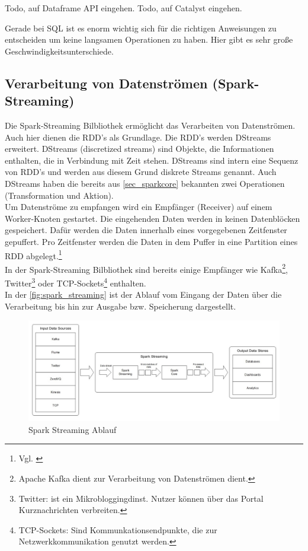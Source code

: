 Todo, auf Dataframe API eingehen.
Todo, auf Catalyst eingehen.


Gerade bei SQL ist es enorm wichtig sich für die richtigen Anweisungen zu entscheiden um keine langsamen Operationen zu haben. 
Hier gibt es sehr große Geschwindigkeitsunterschiede.

\newpage
\subsection{Verarbeitung von Datenströmen (Spark-Streaming)}


Die Spark-Streaming Bilbliothek ermöglicht das Verarbeiten von Datenströmen. Auch hier dienen die RDD's als Grundlage. Die RDD's werden DStreams erweitert. DStreams (discretized streams) sind Objekte, die Informationen enthalten, die in Verbindung mit Zeit stehen. DStreams sind intern eine Sequenz von RDD's und werden aus diesem Grund diskrete Streams genannt.
Auch DStreams haben die bereits aus \ref{sec_sparkcore} bekannten zwei Operationen (Transformation und Aktion). \\

\noindent
Um Datenströme zu empfangen wird ein Empfänger (Receiver) auf einem Worker-Knoten gestartet. Die eingehenden Daten werden in keinen Datenblöcken gespeichert. Dafür werden die Daten innerhalb eines vorgegebenen Zeitfenster gepuffert. Pro Zeitfenster werden die Daten in dem Puffer in eine Partition eines RDD abgelegt.\footnote{Vgl. \cite{BDS16}} \\

\noindent
In der Spark-Streaming Bilbliothek sind bereits einige Empfänger wie Kafka\footnote{Apache Kafka dient zur Verarbeitung von Datenströmen dient.}, Twitter\footnote{Twitter: ist ein Mikrobloggingdinst. Nutzer können über das Portal Kurznachrichten verbreiten. } oder TCP-Sockets\footnote{TCP-Sockets: Sind Kommunkationsendpunkte, die zur Netzwerkkommunikation genutzt werden. } enthalten. \\
In der \autoref{fig:spark_streaming} ist der Ablauf vom Eingang der Daten über die Verarbeitung bis hin zur Ausgabe bzw. Speicherung dargestellt.

\begin{figure}[h]
  \centering
  \includegraphics[width=\textwidth]{./bilder/spark_streaming.jpg}
  \caption{Spark Streaming Ablauf \cite{INFOQ_STREAMING}}\label{fig:spark_streaming}
\end{figure}





